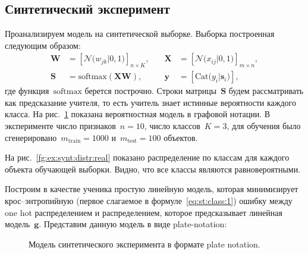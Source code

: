 \documentclass[12pt, twoside]{article}
\begin{document}
\subsection{Синтетический эксперимент}
Проанализируем модель на синтетической выборке. Выборка построенная следующим образом:
\[
\begin{aligned}
\mathbf{W} &= \left[\mathcal{N}\bigr(w_{jk}|0, 1\bigr)\right]_{n\times K}, \quad &\mathbf{X} &= \left[\mathcal{N}\bigr(x_{ij}|0, 1\bigr)\right]_{m\times n}, \\
 \mathbf{S} &= \text{softmax}\left(\mathbf{XW}\right), \quad &\mathbf{y} &= \left[\text{Cat}\bigr(y_i| \mathbf{s}_i\bigr)\right],
\end{aligned}
\]
где функция~$\text{softmax}$ берется построчно. Строки матрицы~$\mathbf{S}$ будем рассматривать как предсказание учителя, то есть учитель знает истинные вероятности каждого класса. На рис.~\ref{fg:ex:synt:plate} показана вероятностная модель в графовой нотации. В эксперименте число признаков~$n=10$, число классов~$K=3$, для обучения было сгенерировано~$m_{\text{train}}=1000$ и~$m_{\text{test}}=100$ объектов.

На рис.~\ref{fg:ex:synt:distr:real} показано распределение по классам для каждого объекта обучающей выборки. Видно, что все классы являются равновероятными.

Построим в качестве ученика простую линейную модель, которая минимизирует крос--энтропийную (первое слагаемое в формуле~\eqref{eq:st:class:1}) ошибку между one hot распределением и распределением, которое предсказывает линейная модель~$\mathbf{g}$. Представим данную модель в виде plate-notation:

\begin{figure}
\begin{center}
\end{center}
\caption{Модель синтетического эксперимента в формате plate notation.}
\label{fg:ex:synt:plate}
\end{figure}
\end{document}
